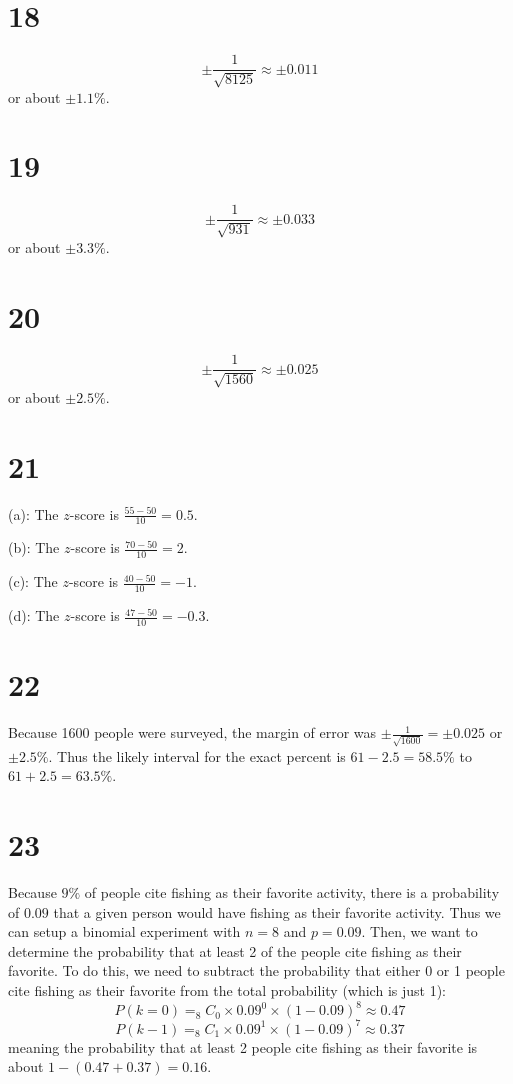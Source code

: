 \documentclass{article}
\theoremstyle{definition}
\newcommand{\?}{\stackrel{?}{=}}
\begin{document}
\section*{18}
\[ \pm\frac{1}{\sqrt{8125}}\approx \pm 0.011 \] or about $\pm 1.1\%$.

\section*{19}
\[ \pm\frac{1}{\sqrt{931}}\approx \pm 0.033 \] or about $\pm 3.3\%$.

\section*{20}
\[ \pm\frac{1}{\sqrt{1560}}\approx \pm 0.025 \] or about $\pm 2.5\%$.

\section*{21}
(a): The $z$-score is $\frac{55-50}{10}=0.5$.


(b): The $z$-score is $\frac{70-50}{10}=2$.


(c): The $z$-score is $\frac{40-50}{10}=-1$.


(d): The $z$-score is $\frac{47-50}{10}=-0.3$.

\section*{22}
Because 1600 people were surveyed, the margin of error was $\pm\frac{1}{\sqrt{1600}}=\pm 0.025$ or $\pm 2.5\%$. Thus the likely interval for the exact percent is 
$61-2.5=58.5\%$ to $61+2.5=63.5\%$.

\section*{23}
Because $9\%$ of people cite fishing as their favorite activity, there is a probability of $0.09$ that a given person would have fishing as their favorite activity. Thus we can setup a binomial 
experiment with $n=8$ and $p=0.09$. Then, we want to determine the probability that at least 2 of the people cite fishing as their favorite. To do this, we need to subtract the probability that either 
0 or 1 people cite fishing as their favorite from the total probability (which is just 1):
\[ P(k=0)=_8C_0\times 0.09^0\times (1-0.09)^8\approx 0.47 \] \[ P(k-1)=_8C_1\times 0.09^1\times (1-0.09)^7\approx 0.37 \] meaning the probability that at least 2 people cite fishing as their 
favorite is about $1-(0.47+0.37)=0.16$.
\end{document}
